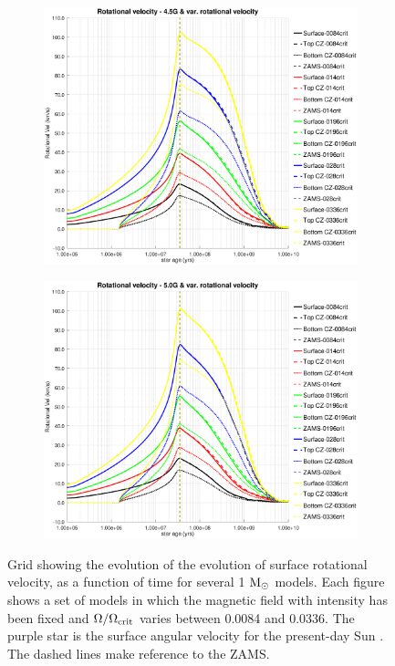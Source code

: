 \documentclass[fleqn,usenatbib]{mnras}
\begin{document}
{{\begin{figure}
\begin{subfigure}[h]{0.47\textwidth}
    \includegraphics[trim = 30mm 15mm 20mm 15mm, clip,width=\textwidth]{figures/rot_vel_var_vel_4_5g.eps}
    \label{fig:subim45}
    \end{subfigure}
    \begin{subfigure}[h]{0.47\textwidth}
    \includegraphics[trim = 30mm 15mm 20mm 15mm, clip,width=\textwidth]{figures/rot_vel_var_vel_5_0g.eps}
    \label{fig:subim46}
    \end{subfigure}
\caption{Grid showing the evolution of the evolution of surface rotational velocity, as a function of time for several 1 $\mathrm{M}_\odot$ models. Each figure shows a set of models in which the magnetic field with intensity has been fixed and $\Omega / \Omega_{\mathrm{crit}}$ varies between 0.0084 and 0.0336. The purple star is the surface angular velocity for the present-day Sun \citep{Gill2012}. The dashed lines make reference to the ZAMS.}
\label{fig:grid_rot_vel}
\end{figure}




}}
\end{document}
